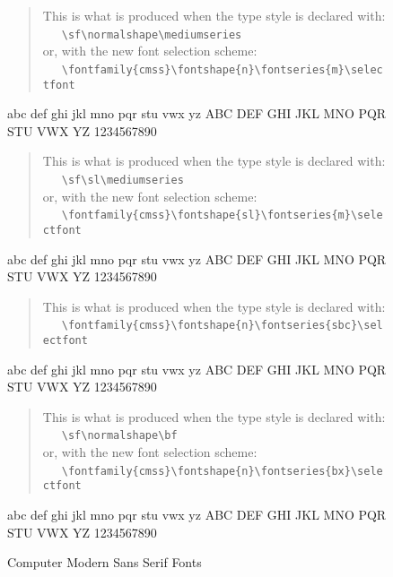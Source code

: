 \begin{figure}
\begin{singlespace}
\begin{verse}
This is what is produced when the type style is declared with:\\
\ \ \ \verb+\sf\normalshape\mediumseries+\\
or, with the new font selection scheme:\\
\ \ \ \verb+\fontfamily{cmss}\fontshape{n}\fontseries{m}\selectfont+
\end{verse}
{\selectfont
abc def ghi jkl mno pqr stu vwx yz ABC DEF GHI JKL MNO PQR STU
VWX YZ 1234567890\par}
\vspace{1em}
\begin{verse}
This is what is produced when the type style is declared with:\\
\ \ \ \verb+\sf\sl\mediumseries+\\
or, with the new font selection scheme:\\
\ \ \ \verb+\fontfamily{cmss}\fontshape{sl}\fontseries{m}\selectfont+
\end{verse}
{\selectfont
abc def ghi jkl mno pqr stu vwx yz ABC DEF GHI JKL MNO PQR STU
VWX YZ 1234567890\par}
\vspace{1em}
\begin{verse}
This is what is produced when the type style is declared with:\\
\ \ \ \verb+\fontfamily{cmss}\fontshape{n}\fontseries{sbc}\selectfont+\\
\end{verse}
{\selectfont
abc def ghi jkl mno pqr stu vwx yz ABC DEF GHI JKL MNO PQR STU
VWX YZ 1234567890\par}
\vspace{1em}
\begin{verse}
This is what is produced when the type style is declared with:\\
\ \ \ \verb+\sf\normalshape\bf+\\
or, with the new font selection scheme:\\
\ \ \ \verb+\fontfamily{cmss}\fontshape{n}\fontseries{bx}\selectfont+
\end{verse}
{\selectfont
abc def ghi jkl mno pqr stu vwx yz ABC DEF GHI JKL MNO PQR STU
VWX YZ 1234567890\par}
\vspace{1em}
\caption{Computer Modern Sans Serif Fonts}
\label{fig:cmss}
\end{singlespace}
\end{figure}
 
